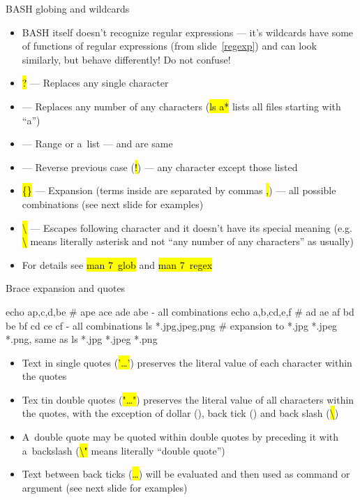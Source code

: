 \documentclass[compress, ucs, xelatex, 11pt, xcolor=svgnames,
  hyperref={
    bookmarks=true,
    unicode=true,
    colorlinks=true,
    pdftitle={Linux, command line and MetaCentrum},
    plainpages=false,
    pdfauthor={Vojtech Zeisek},
    pdfsubject={Course about use of Linux command line, writing shell scripts and using MetaCentrum of CESNET},
    pdfcreator={XeLaTeX},
    pdfkeywords={Linux, GNU, BASH, shell, command line, MetaCentrum},
    linkcolor=DarkRed,
    anchorcolor=DarkBlue,
    citecolor=Indigo,
    filecolor=NavyBlue,
    menucolor=DarkMagenta,
    urlcolor=DarkBlue,
    pdftex},
  url={hyphens, lowtilde} %
  ]{beamer}
\renewcommand{\texttt}[1]{\hl{\ttfamily #1}}
\begin{document}
\begin{frame}{BASH globing and wildcards}
  \label{globbing}
  \begin{itemize}
    \item BASH itself doesn't recognize regular expressions --- it's wildcards have some of functions of regular expressions (from slide~\ref{regexp}) and can look similarly, but behave differently! Do not confuse!
    \item \texttt{?} --- Replaces any single character
    \item \texttt{*} --- Replaces any number of any characters (\texttt{ls a*} lists all files starting with ``a'')
    \item \texttt{[]} --- Range or a~list --- \texttt{[abcdef]} and \texttt{[a-f]} are same
    \item \texttt{[!\ldots]} --- Reverse previous case (\texttt{!}) --- any character except those listed
    \item \texttt{\{\}} --- Expansion (terms inside are separated by commas \texttt{,}) --- all possible combinations (see next slide for examples)
    \item \texttt{\textbackslash} --- Escapes following character and it doesn't have its special meaning (e.g. \texttt{\textbackslash *} means literally asterisk \texttt{*} and not ``any number of any characters'' as usually)
    \item For details see \texttt{man 7~glob} and \texttt{man 7~regex}
  \end{itemize}
\end{frame}

\begin{frame}[fragile]{Brace expansion and quotes}
  \begin{bashcode}
    echo a{p,c,d,b}e # ape ace ade abe - all combinations
    echo {a,b,c}{d,e,f} # ad ae af bd be bf cd ce cf - all combinations
    ls *.{jpg,jpeg,png} # expansion to *.jpg *.jpeg *.png, same as
    ls *.jpg *.jpeg *.png
  \end{bashcode}
  \begin{itemize}
    \item Text in single quotes (\texttt{'\ldots'}) preserves the literal value of each character within the quotes
    \item Tex tin double quotes (\texttt{"\ldots"}) preserves the literal value of all characters within the quotes, with the exception of dollar (\texttt{\textdollar}), back tick (\texttt{\textasciigrave}) and back slash (\texttt{\textbackslash})
    \item A~double quote may be quoted within double quotes by preceding it with a~backslash (\texttt{\textbackslash"} means literally ``double quote'')
    \item Text between back ticks (\texttt{\textasciigrave\ldots\textasciigrave}) will be evaluated and then used as command or argument (see next slide for examples)
  \end{itemize}
\end{frame}
\end{document}
